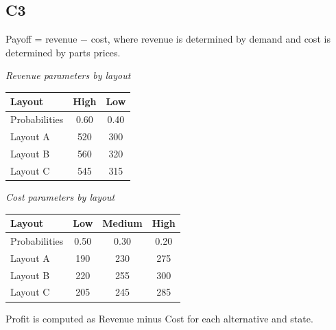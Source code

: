 \begin{ExamProblems}
		\subsection*{C3}
		Payoff = revenue $-$ cost, where revenue is determined by demand and cost is determined by parts prices.
		\begin{center}
			\begin{minipage}[t]{0.48\linewidth}
				\textit{Revenue parameters by layout}
				\begin{center}
					\begin{tabular}{l c c}
						\toprule
						Layout & High & Low \\
						\midrule
						Probabilities & 0.60 & 0.40 \\
						Layout A & 520 & 300 \\
						Layout B & 560 & 320 \\
						Layout C & 545 & 315 \\
						\bottomrule
					\end{tabular}
				\end{center}
			\end{minipage}
			\hfill
			\begin{minipage}[t]{0.48\linewidth}
				\textit{Cost parameters by layout}
				\begin{center}
					\begin{tabular}{l c c c}
						\toprule
						Layout & Low & Medium & High \\
						\midrule
						Probabilities & 0.50 & 0.30 & 0.20 \\
						Layout A & 190 & 230 & 275 \\
						Layout B & 220 & 255 & 300 \\
						Layout C & 205 & 245 & 285 \\
						\bottomrule
					\end{tabular}
				\end{center}
			\end{minipage}
		\end{center}
		Profit is computed as Revenue minus Cost for each alternative and state.
		

\end{ExamProblems}
